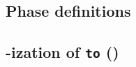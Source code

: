 \subsection{Phase definitions}              \label{rlptxn: phase definitions}                 
\subsection{\rlp{}-ization of \texttt{to} (\phaseTo)}                                             
